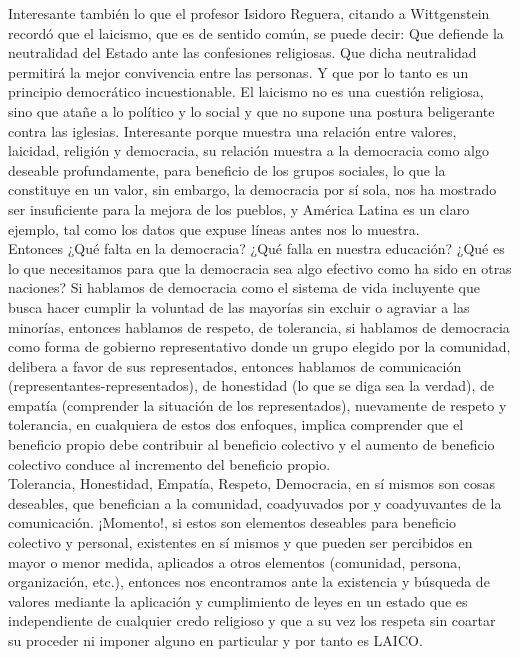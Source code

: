 \documentclass[12pt]{book} %
\begin{document}
Interesante también lo que el profesor Isidoro Reguera, citando a Wittgenstein recordó que el laicismo, que es de sentido común, se puede decir: Que defiende la neutralidad del Estado ante las confesiones religiosas. Que dicha neutralidad permitirá la mejor convivencia entre las personas. Y que por lo tanto es un principio democrático incuestionable. El laicismo no es una cuestión religiosa, sino que atañe a lo político y lo social y que no supone una postura beligerante contra las iglesias. Interesante porque muestra una relación entre valores, laicidad, religión y democracia, su relación muestra a la democracia como algo deseable profundamente, para beneficio de los grupos sociales, lo que la constituye en un valor, sin embargo, la democracia por sí sola, nos ha mostrado ser insuficiente para la mejora de los pueblos, y América Latina es un claro ejemplo, tal como los datos que expuse líneas antes nos lo muestra.\\

Entonces ¿Qué falta en la democracia? ¿Qué falla en nuestra educación? ¿Qué es lo que necesitamos para que la democracia sea algo efectivo como ha sido en otras naciones? Si hablamos de democracia como el sistema de vida incluyente que busca hacer cumplir la voluntad de las mayorías sin excluir o agraviar a las minorías, entonces hablamos de respeto, de tolerancia, si hablamos de democracia como forma de gobierno representativo donde un grupo elegido por la comunidad, delibera a favor de sus representados, entonces hablamos de comunicación (representantes-representados), de honestidad (lo que se diga sea la verdad), de empatía (comprender la situación de los representados), nuevamente de respeto y tolerancia, en cualquiera de estos dos enfoques, implica comprender que el beneficio propio debe contribuir al beneficio colectivo y el aumento de beneficio colectivo conduce al incremento del beneficio propio.\\

Tolerancia, Honestidad, Empatía, Respeto, Democracia, en sí mismos son cosas deseables, que benefician a la comunidad, coadyuvados por y coadyuvantes de la comunicación. ¡Momento!, si estos son elementos deseables para beneficio colectivo y personal, existentes en sí mismos y que pueden ser percibidos en mayor o menor medida, aplicados a otros elementos (comunidad, persona, organización, etc.), entonces nos encontramos ante la existencia y búsqueda de valores mediante la aplicación y cumplimiento de leyes en un estado que es independiente de cualquier credo religioso y que a su vez los respeta sin coartar su proceder ni imponer alguno en particular y por tanto es LAICO.
\end{document}
